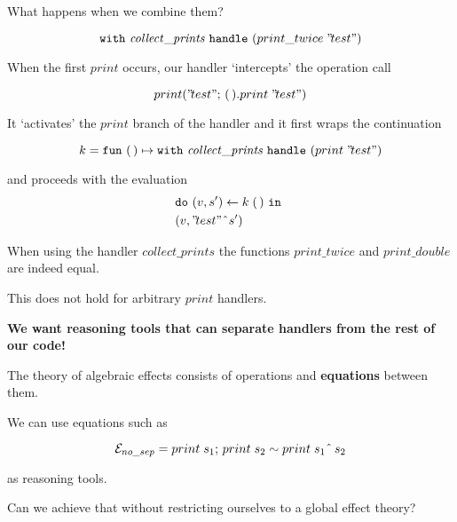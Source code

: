 \documentclass[usenames,dvipsnames]{beamer}
\begin{document}
\begin{frame}

	What happens when we combine them?
	\pause

	\[ \mathtt{with}~{\mathit{collect\_prints}}~\mathtt{handle}~{({print\_twice}\;{"\!test"})} \]
	\pause

	When the first $print$ occurs, our handler `intercepts' the operation call

	\[ \operation[print]{"\!test"}{\unit.\apply{print}{"\!test"}} \]
	\pause

	It `activates' the $print$ branch of the handler and it first wraps the continuation

	\[
		k = \mathtt{fun}~{\mathtt{(\,)}} \mapsto{\mathtt{with}~{\mathit{collect\_prints}}~\mathtt{handle}~{({print}\;{"\!test"})}}
	\]

	\pause

	and proceeds with the evaluation
	\begin{align*}
		&\mathtt{do}~{(v, s')} \leftarrow{{k}\;{\mathtt{(\,)}}}~\mathtt{in}~\\
		&(v, "\!test"\;\hat{}\; s')
	\end{align*} 


\end{frame}
\begin{frame}
	When using the handler $\mathit{collect\_prints}$ the functions $print\_twice$ and $print\_double$ are indeed equal.

	\vspace{5mm}

	This does not hold for arbitrary $print$ handlers.

	\pause
	\vspace{5mm}

	\textbf{We want reasoning tools that can separate handlers from the rest of our code!}
\end{frame}
\begin{frame}
	The theory of algebraic effects consists of operations and \textbf{equations} between them.

	\vspace{5mm}

	We can use equations such as

	\[
		\mathcal{E}_{no\_sep} = {print}\;{s_1};\, {print}\;{s_2} \sim {print}\;{s_1  \;\hat{}\; \, s_2}
	\]

	as reasoning tools.

	\vspace{5mm}

	\pause

	Can we achieve that without restricting ourselves to a global effect theory?

\end{frame}
\end{document}
